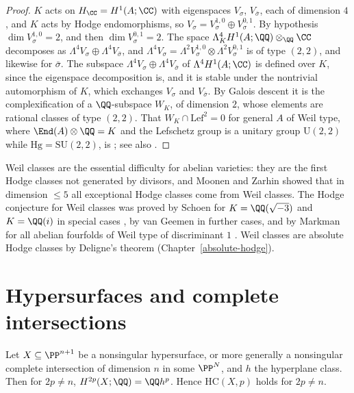 \begin{proof}
$K$ acts on $H_\CC = H^1(A; \CC)$ with eigenspaces $V_\sigma$, $V_{\bar\sigma}$, each of dimension $4$, and $K$ acts by Hodge endomorphisms, so $V_\sigma = V_\sigma^{1,0} \oplus V_\sigma^{0,1}$. By
hypothesis $\dim V_\sigma^{1,0} = 2$, and then $\dim V_\sigma^{0,1} = 2$. The space $\Lambda^4_KH^1(A; \QQ) \otimes_\QQ\CC$ decomposes as $\Lambda^4V_\sigma \oplus \Lambda^4V_{\bar\sigma}$, and
$\Lambda^4V_\sigma = \Lambda^2V_\sigma^{1,0} \otimes \Lambda^2V_\sigma^{0,1}$ is of type $(2,2)$, and likewise for $\bar\sigma$. The subspace $\Lambda^4V_\sigma \oplus \Lambda^4V_{\bar\sigma}$ of
$\Lambda^4H^1(A; \CC)$ is defined over $K$, since the eigenspace decomposition is, and it is stable under the nontrivial automorphism of $K$, which exchanges $V_\sigma$ and $V_{\bar\sigma}$. By Galois
descent it is the complexification of a $\QQ$-subspace $W_K$, of dimension $2$, whose elements are rational classes of type $(2,2)$. That $W_K \cap \mathrm{Lef}^2 = 0$ for general $A$ of Weil type, where $\End(A) \otimes \QQ = K$ and the Lefschetz
group is a unitary group $\mathrm{U}(2,2)$ while $\mathrm{Hg} = \mathrm{SU}(2,2)$, is \cite{weil-1977}; see also \cite{birkenhake-lange}.
\end{proof}

\begin{remark}\label{known-cases:remark-weil-classes}
Weil classes are the essential difficulty for abelian varieties: they are the first Hodge classes not generated by divisors, and Moonen and Zarhin showed that in dimension $\leq 5$
all exceptional Hodge classes come from Weil classes. The Hodge conjecture for Weil classes was proved by Schoen for $K = \QQ(\sqrt{-3})$ and $K = \QQ(i)$ in special cases \cite{schoen-1988},
by van Geemen in further cases, and by Markman for all abelian fourfolds of Weil type of discriminant $1$ \cite{markman-2023}. Weil classes are absolute Hodge classes by Deligne's theorem
(Chapter~\ref{absolute-hodge}).
\end{remark}

\section{Hypersurfaces and complete intersections}\label{known-cases:section-hypersurfaces}

\begin{proposition}\label{known-cases:proposition-hypersurfaces}
Let $X \subseteq \PP^{n+1}$ be a nonsingular hypersurface, or more generally a nonsingular complete intersection of dimension $n$ in some $\PP^N$, and $h$ the hyperplane class. Then for $2p \neq n$,
$H^{2p}(X; \QQ) = \QQ h^p$. Hence $\mathrm{HC}(X, p)$ holds for $2p \neq n$.
\end{proposition}

